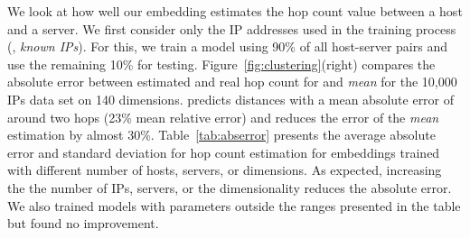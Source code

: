 %


We look at how well our embedding estimates the hop count value between a host and a server. We first consider only the IP addresses used in the training process (\ie{}, {\em known IPs}). For this, we train a model using 90\% of all host-server pairs and use the remaining 10\% for testing. Figure~\ref{fig:clustering}(right) compares the absolute error between estimated and real hop count for \system{} and {\em mean} for the 10,000 IPs data set on 140 dimensions. \system{} predicts distances with a mean absolute error of around two hops (23\% mean relative error) and reduces the error of the {\em mean} estimation by almost 30\%.
%
Table~\ref{tab:abserror} presents the average absolute error and standard deviation for hop count estimation for embeddings trained with different number of hosts, servers, or dimensions. As expected, increasing the the number of IPs, servers, or the dimensionality reduces the absolute error. We also trained models with parameters outside the ranges presented in the table but found no improvement.







